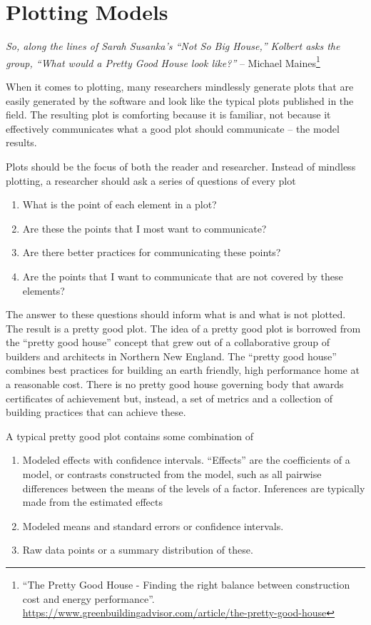 \documentclass[]{book}
\providecommand{\tightlist}{%
  \setlength{\itemsep}{0pt}\setlength{\parskip}{0pt}}
\let\rmarkdownfootnote\footnote%
\def\footnote{\protect\rmarkdownfootnote}
\begin{document}
\chapter{Plotting Models}\label{plotting-models}

\emph{So, along the lines of Sarah Susanka's ``Not So Big House,''
Kolbert asks the group, ``What would a Pretty Good House look like?''}
-- Michael Maines\footnote{``The Pretty Good House - Finding the right
  balance between construction cost and energy performance''.
  \url{https://www.greenbuildingadvisor.com/article/the-pretty-good-house}}

When it comes to plotting, many researchers mindlessly generate plots
that are easily generated by the software and look like the typical
plots published in the field. The resulting plot is comforting because
it is familiar, not because it effectively communicates what a good plot
should communicate -- the model results.

Plots should be the focus of both the reader and researcher. Instead of
mindless plotting, a researcher should ask a series of questions of
every plot

\begin{enumerate}
\def\labelenumi{\arabic{enumi}.}
\tightlist
\item
  What is the point of each element in a plot?
\item
  Are these the points that I most want to communicate?
\item
  Are there better practices for communicating these points?
\item
  Are the points that I want to communicate that are not covered by
  these elements?
\end{enumerate}

The answer to these questions should inform what is and what is not
plotted. The result is a pretty good plot. The idea of a pretty good
plot is borrowed from the ``pretty good house'' concept that grew out of
a collaborative group of builders and architects in Northern New
England. The ``pretty good house'' combines best practices for building
an earth friendly, high performance home at a reasonable cost. There is
no pretty good house governing body that awards certificates of
achievement but, instead, a set of metrics and a collection of building
practices that can achieve these.

A typical pretty good plot contains some combination of

\begin{enumerate}
\def\labelenumi{\arabic{enumi}.}
\tightlist
\item
  Modeled effects with confidence intervals. ``Effects'' are the
  coefficients of a model, or contrasts constructed from the model, such
  as all pairwise differences between the means of the levels of a
  factor. Inferences are typically made from the estimated effects
\item
  Modeled means and standard errors or confidence intervals.
\item
  Raw data points or a summary distribution of these.
\end{enumerate}
\end{document}
